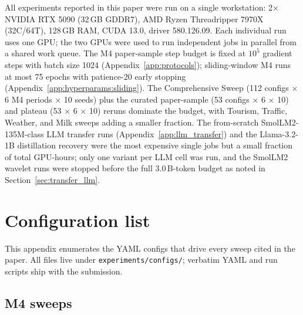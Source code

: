 \documentclass[11pt,a4paper]{article}
\begin{document}
All experiments reported in this paper were run on a single workstation: 2$\times$ NVIDIA RTX 5090 (32\,GB GDDR7), AMD Ryzen Threadripper 7970X (32C/64T), 128\,GB RAM, CUDA 13.0, driver 580.126.09. Each individual run uses one GPU; the two GPUs were used to run independent jobs in parallel from a shared work queue. The M4 paper-sample step budget is fixed at $10^5$ gradient steps with batch size 1024 (Appendix~\ref{app:protocols}); sliding-window M4 runs at most 75 epochs with patience-20 early stopping (Appendix~\ref{app:hyperparams:sliding}). The Comprehensive Sweep (112 configs $\times$ 6 M4 periods $\times$ 10 seeds) plus the curated paper-sample (53 configs $\times$ 6 $\times$ 10) and plateau (53 $\times$ 6 $\times$ 10) reruns dominate the budget, with Tourism, Traffic, Weather, and Milk sweeps adding a smaller fraction. The from-scratch SmolLM2-135M-class LLM transfer runs (Appendix~\ref{app:llm_transfer}) and the Llama-3.2-1B distillation recovery were the most expensive single jobs but a small fraction of total GPU-hours; only one variant per LLM cell was run, and the SmolLM2 wavelet runs were stopped before the full 3.0\,B-token budget as noted in Section~\ref{sec:transfer_llm}.

\section{Configuration list}
\label{app:configs}

This appendix enumerates the YAML configs that drive every sweep cited in the paper. All files live under \texttt{experiments/configs/}; verbatim YAML and run scripts ship with the submission.

\subsection{M4 sweeps}
\label{app:configs:m4}
\end{document}

